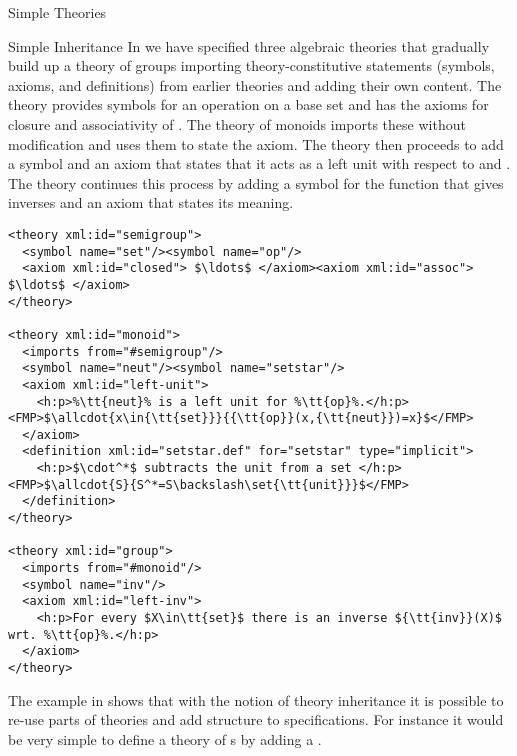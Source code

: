 \begin{module}[id=theories]
\begin{omgroup}{Simple Theories}
\begin{omgroup}[id=inheritance]{Simple Inheritance}
In {} we have specified three algebraic theories that gradually build
up a theory of groups importing theory-constitutive statements (symbols, axioms, and
definitions) from earlier theories and adding their own content. The theory
{} provides symbols for an operation {} on a base set
{} and has the axioms for closure and associativity of
{}. The theory of monoids imports these without modification and uses them
to state the {} axiom. The theory {} then proceeds to
add a symbol {} and an axiom that states that it acts as a left unit with
respect to {} and {}.  The theory {}
continues this process by adding a symbol {} for the function that gives
inverses and an axiom that states its meaning.

\begin{lstlisting}[label=lst:def-group,escapechar=\%,mathescape,
  caption={A Structured Development of Algebraic Theories in \omdoc},
  index={theory,symbol,axiom,imports}]
<theory xml:id="semigroup">
  <symbol name="set"/><symbol name="op"/>
  <axiom xml:id="closed"> $\ldots$ </axiom><axiom xml:id="assoc"> $\ldots$ </axiom>
</theory>

<theory xml:id="monoid">
  <imports from="#semigroup"/>
  <symbol name="neut"/><symbol name="setstar"/>
  <axiom xml:id="left-unit">
    <h:p>%\tt{neut}% is a left unit for %\tt{op}%.</h:p><FMP>$\allcdot{x\in{\tt{set}}}{{\tt{op}}(x,{\tt{neut}})=x}$</FMP>
  </axiom>
  <definition xml:id="setstar.def" for="setstar" type="implicit">
    <h:p>$\cdot^*$ subtracts the unit from a set </h:p><FMP>$\allcdot{S}{S^*=S\backslash\set{\tt{unit}}}$</FMP>
  </definition>
</theory>

<theory xml:id="group"> 
  <imports from="#monoid"/>
  <symbol name="inv"/>
  <axiom xml:id="left-inv">
    <h:p>For every $X\in\tt{set}$ there is an inverse ${\tt{inv}}(X)$ wrt. %\tt{op}%.</h:p>
  </axiom>
</theory>
\end{lstlisting}

The example in {} shows that with the notion of theory inheritance it
is possible to re-use parts of theories and add structure to specifications. For instance
it would be very simple to define a theory of {s} by adding a
{}.


\end{omgroup}
\end{omgroup}
\end{module}
